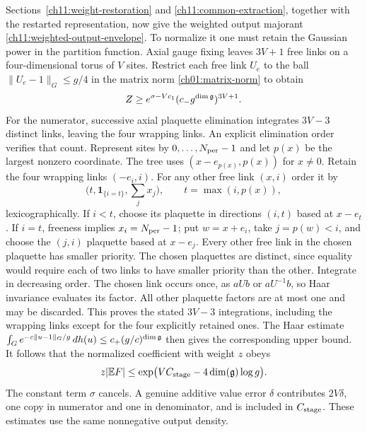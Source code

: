 Sections~\ref{ch11:weight-restoration} and
\ref{ch11:common-extraction}, together with the restarted
representation, now give the weighted output majorant
\eqref{ch11:weighted-output-envelope}.
To normalize it one must retain the Gaussian power in the
partition function. Axial gauge fixing leaves $3V+1$ free links
on a four-dimensional torus of $V$ sites. Restrict each free link $U_e$
to the ball $\|U_e-1\|_G\le g/4$ in the matrix norm
\eqref{ch01:matrix-norm} to obtain
\[
 Z\ge e^{\sigma-Vc_1}(c_-g^{\dim\mathfrak g})^{3V+1}.
\]
For the numerator, successive axial plaquette elimination
integrates $3V-3$ distinct links, leaving the four wrapping
links. An explicit elimination order verifies that count.
Represent sites by $0,\ldots,N_{\rm per}-1$ and let $p(x)$
be the largest nonzero coordinate. The tree uses
$(x-e_{p(x)},p(x))$ for $x\ne0$.
Retain the four wrapping links $(-e_i,i)$.
For any other free link $(x,i)$ order it by
\[
 \bigl(t,\mathbf1_{\{i=t\}},\textstyle\sum_jx_j\bigr),
 \qquad t=\max(i,p(x)),
\]
lexicographically. If $i<t$, choose its plaquette in directions
$(i,t)$ based at $x-e_t$. If $i=t$, freeness implies
$x_i=N_{\rm per}-1$; put $w=x+e_i$, take $j=p(w)<i$,
and choose the $(j,i)$ plaquette based at $x-e_j$.
Every other free link in the chosen plaquette has smaller priority.
The chosen plaquettes are distinct, since equality would require
each of two links to have smaller priority than the other.
Integrate in decreasing order. The chosen link occurs once,
as $aUb$ or $aU^{-1}b$, so Haar invariance evaluates its factor.
All other plaquette factors are at most one and may be discarded.
This proves the stated $3V-3$ integrations, including the
wrapping links except for the four explicitly retained ones.
The Haar estimate
$\int_Ge^{-c\|u-1\|_G/g}\,dh(u)\le c_+(g/c)^{\dim\mathfrak g}$
then gives the corresponding upper bound.
It follows that the normalized coefficient with weight $z$
obeys
\[
 z|\mathbb E F|
 \le \exp\bigl(VC_{\rm stage}-4\dim(\mathfrak g)\log g\bigr).
\]
The constant term $\sigma$ cancels. A genuine additive value error
$\delta$ contributes $2V\delta$, one copy in numerator and
one in denominator, and is included in $C_{\rm stage}$.
These estimates use the same nonnegative output density.

